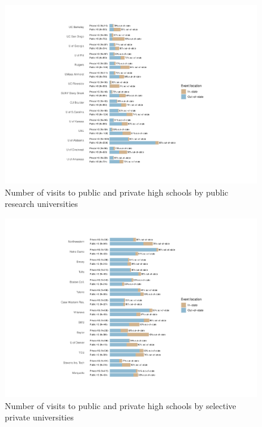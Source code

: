 \documentclass[
]{article}
\begin{document}
\begin{landscape}
\begin{figure}
{\centering \includegraphics[width=2\linewidth]{../assets/figures/events_hs_count_pubu} 

}

\caption{Number of visits to public and private high schools by public research universities}\label{fig:events-hs-count-pubu}
\end{figure}

\newpage

\begin{figure}

{\centering \includegraphics[width=2\linewidth]{../assets/figures/events_hs_count_privu} 

}

\caption{Number of visits to public and private high schools by selective private universities}\label{fig:events-hs-count-privu}
\end{figure}


\end{landscape}
\end{document}
